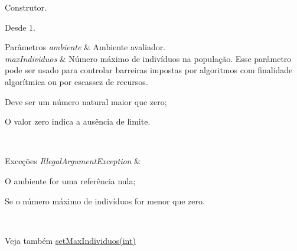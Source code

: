 Construtor. 

\begin{DoxySince}{Desde}
1.
\end{DoxySince}

\begin{DoxyParams}{Parâmetros}
{\em ambiente} & Ambiente avaliador. \\
\hline
{\em max\-Individuos} & Número máximo de indivíduos na população. Esse parâmetro pode ser usado para controlar barreiras impostas por algoritmos com finalidade algorítmica ou por escassez de recursos. 
\begin{DoxyItemize}
\item Deve ser um número natural maior que zero; 
\item O valor zero indica a ausência de limite.  
\end{DoxyItemize}\\
\hline
\end{DoxyParams}

\begin{DoxyExceptions}{Exceções}
{\em Illegal\-Argument\-Exception} & 
\begin{DoxyItemize}
\item O ambiente for uma referência nula; 
\item Se o número máximo de indivíduos for menor que zero. 
\end{DoxyItemize}\\
\hline
\end{DoxyExceptions}
\begin{DoxySeeAlso}{Veja também}
\hyperlink{classic_1_1populacional_1_1_populacao_3_01_g_01extends_01_number_01_6_comparable_3_01_g_01_4_00_506237fa66af7bbd01f529b68d4beaca_a7f44661087d1894747f7bc4c25cb47f6}{set\-Max\-Individuos(int)} 
\end{DoxySeeAlso}


